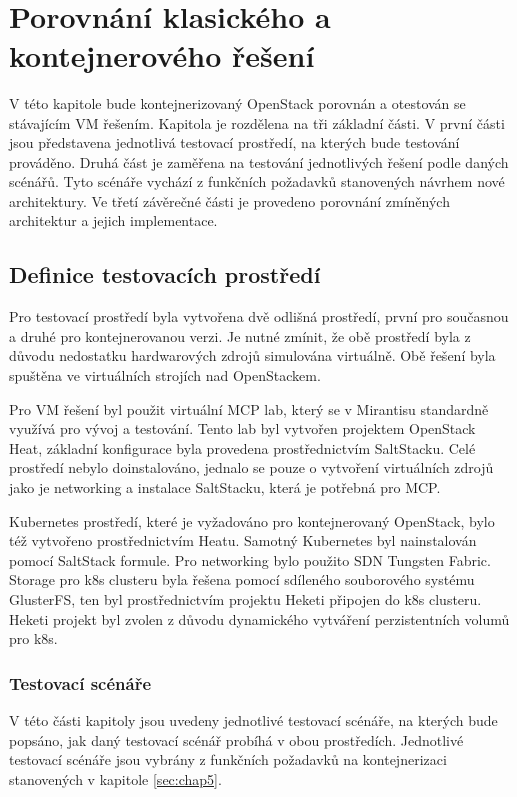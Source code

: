 	 	 	
­\chapter{Porovnání klasického a kontejnerového řešení}
V této kapitole bude kontejnerizovaný OpenStack porovnán a otestován se stávajícím VM řešením. Kapitola je rozdělena na tři základní části. V první části jsou představena jednotlivá testovací prostředí, na kterých bude testování prováděno. Druhá část je zaměřena na testování jednotlivých řešení podle daných scénářů. Tyto scénáře vychází z funkčních požadavků stanovených návrhem nové architektury. Ve třetí závěrečné části je provedeno porovnání zmíněných architektur a jejich implementace.


\section{Definice testovacích prostředí}
Pro testovací prostředí byla vytvořena dvě odlišná prostředí, první pro současnou a druhé pro kontejnerovanou verzi. Je nutné zmínit, že obě prostředí byla z důvodu nedostatku hardwarových zdrojů simulována virtuálně. Obě řešení byla spuštěna ve virtuálních strojích nad OpenStackem.

Pro VM řešení byl použit virtuální MCP lab, který se v Mirantisu standardně využívá pro vývoj a testování. Tento lab byl vytvořen projektem OpenStack Heat, základní konfigurace byla provedena prostřednictvím SaltStacku. Celé prostředí nebylo doinstalováno, jednalo se pouze o vytvoření virtuálních zdrojů jako je networking a instalace SaltStacku, která je potřebná pro MCP.

Kubernetes prostředí, které je vyžadováno pro kontejnerovaný OpenStack, bylo též vytvořeno prostřednictvím Heatu. Samotný Kubernetes byl nainstalován pomocí SaltStack formule. Pro networking bylo použito SDN Tungsten Fabric. Storage pro k8s clusteru byla řešena pomocí sdíleného souborového systému GlusterFS, ten byl prostřednictvím projektu Heketi připojen do k8s clusteru. Heketi projekt byl zvolen z důvodu dynamického vytváření perzistentních volumů pro k8s.

\subsection{Testovací scénáře}
V této části kapitoly jsou uvedeny jednotlivé testovací scénáře, na kterých bude popsáno, jak daný testovací scénář probíhá v obou prostředích. Jednotlivé testovací scénáře jsou vybrány z funkčních požadavků na kontejnerizaci stanovených v kapitole \ref{sec:chap5}.

